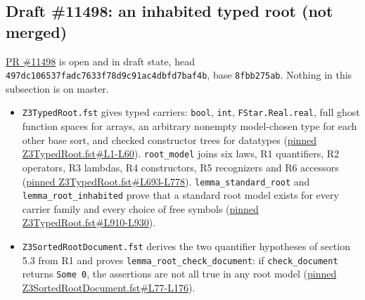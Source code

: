 \documentclass[10pt,a4paper]{article}
\begin{document}
\subsection{Draft \#11498: an inhabited typed root (not merged)}\label{sec:54-draft-11498-an-inhabited-typed-root-not-merged}

\href{https://github.com/Z3Prover/z3/pull/11498}{PR \#11498} is open and in draft state, head \texttt{497dc106537fadc7\allowbreak{}633f78d9c91ac4db\allowbreak{}fd7baf4b}, base \texttt{8fbb275ab}. Nothing in this subsection is on master.

\begin{itemize}\setlength{\itemsep}{1pt}\setlength{\parskip}{0pt}

\item \texttt{Z3TypedRoot.\allowbreak{}fst} gives typed carriers: \texttt{bool}, \texttt{int}, \texttt{FStar.\allowbreak{}Real.\allowbreak{}real}, full ghost function spaces for arrays, an arbitrary nonempty model-chosen type for each other base sort, and checked constructor trees for datatypes (\href{https://github.com/Z3Prover/z3/blob/497dc106537fadc7633f78d9c91ac4dbfd7baf4b/fstar/Z3TypedRoot.fst\#L1-L60}{pinned Z3TypedRoot.fst\#L1-L60}). \texttt{root\_\allowbreak{}model} joins six laws, R1 quantifiers, R2 operators, R3 lambdas, R4 constructors, R5 recognizers and R6 accessors (\href{https://github.com/Z3Prover/z3/blob/497dc106537fadc7633f78d9c91ac4dbfd7baf4b/fstar/Z3TypedRoot.fst\#L693-L778}{pinned Z3TypedRoot.fst\#L693-L778}). \texttt{lemma\_\allowbreak{}standard\_\allowbreak{}root} and \texttt{lemma\_\allowbreak{}root\_\allowbreak{}inhabited} prove that a standard root model exists for every carrier family and every choice of free symbols (\href{https://github.com/Z3Prover/z3/blob/497dc106537fadc7633f78d9c91ac4dbfd7baf4b/fstar/Z3TypedRoot.fst\#L910-L930}{pinned Z3TypedRoot.fst\#L910-L930}).

\item \texttt{Z3SortedRootDocu\allowbreak{}ment.\allowbreak{}fst} derives the two quantifier hypotheses of section 5.3 from R1 and proves \texttt{lemma\_\allowbreak{}root\_\allowbreak{}check\_\allowbreak{}document}: if \texttt{check\_\allowbreak{}document} returns \texttt{Some 0}, the assertions are not all true in any root model (\href{https://github.com/Z3Prover/z3/blob/497dc106537fadc7633f78d9c91ac4dbfd7baf4b/fstar/Z3SortedRootDocument.fst\#L77-L176}{pinned Z3SortedRootDocument.fst\#L77-L176}).


\end{itemize}
\end{document}
